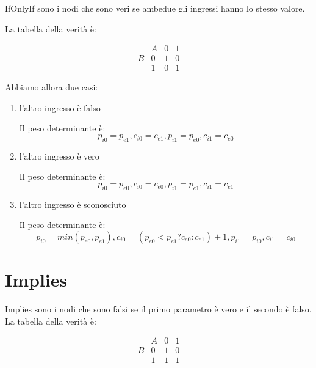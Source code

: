 \documentclass{article}
\begin{document}
  IfOnlyIf sono i nodi che sono veri se ambedue gli ingressi hanno lo stesso
  valore.
  
  La tabella della verit\`a \`e:
  
\[
    \begin{array}{llll}
      & A& 0 & 1
      \\
      B& 0 & 1 & 0
      \\
      & 1 & 0 & 1
    \end{array}
\]
 
  Abbiamo allora due casi:
  \begin{enumerate}
    \item l'altro ingresso \`e falso
 
      Il peso determinante \`e:
      \begin{equation}
	p_{i0}=p_{e1}, c_{i0}=c_{e1}, p_{i1}=p_{e0}, c_{i1}=c_{e0}
      \end{equation}

    \item l'altro ingresso \`e vero
 
      Il peso determinante \`e:
      \begin{equation}
	p_{i0}=p_{e0}, c_{i0}=c_{e0}, p_{i1}=p_{e1}, c_{i1}=c_{e1}
      \end{equation}

    \item l'altro ingresso \`e sconosciuto
 
      Il peso determinante \`e:
      \begin{equation}
	  p_{i0}=min(p_{e0},p_{e1}), c_{i0}=(p_{e0}< p_{e1} ? c_{e0} : c_{e1})+1,
	  p_{i1}=p_{i0}, c_{i1}=c_{i0}
      \end{equation}

  \end{enumerate}
  
  \section{Implies}
  
  Implies sono i nodi che sono falsi se il primo parametro \`e vero e il
  secondo \`e falso.
  La tabella della verit\`a \`e:
  
  \[
    \begin{array}{llll}
      & A& 0 & 1
      \\
      B& 0 & 1 & 0
      \\
      & 1 & 1 & 1
    \end{array}
  \]
  
\end{document}

